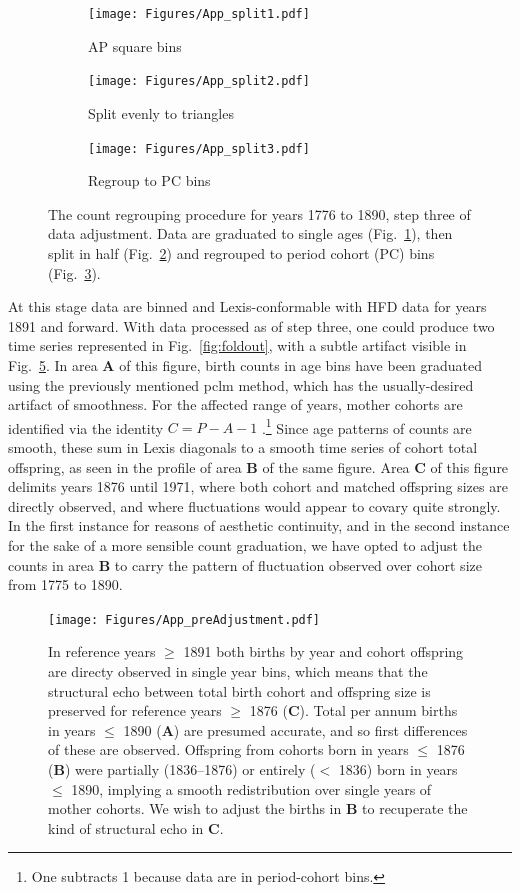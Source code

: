 \documentclass{article}
\begin{document}
\begin{appendix}
\begin{figure}[ht!]
\centering
\begin{subfigure}{.3\textwidth}
  \centering
  \texttt{[image: Figures/App\_split1.pdf]}
  \caption{AP square bins}
  \label{fig:app1}
\end{subfigure}%
\begin{subfigure}{.3\textwidth}
  \centering
  \texttt{[image: Figures/App\_split2.pdf]}
  \caption{Split evenly to triangles}
  \label{fig:app2}
\end{subfigure}
\begin{subfigure}{.3\textwidth}
  \centering
  \texttt{[image: Figures/App\_split3.pdf]}
  \caption{Regroup to PC bins}
  \label{fig:app3}
\end{subfigure}
\caption{The count regrouping procedure for years 1776 to 1890, step three of data adjustment. Data are graduated to single ages (Fig.~\ref{fig:app1}), then split in half (Fig.~\ref{fig:app2}) and regrouped to period cohort (PC) bins (Fig.~\ref{fig:app3}).}
\label{fig:AP2PC}
\end{figure}
At this stage data are binned and Lexis-conformable with HFD data for years 1891 and forward. With data processed as of step three, one could produce two time series represented in Fig.~\ref{fig:foldout}, with a subtle artifact visible in Fig.~\ref{fig:toosmooth}. In area \textbf{A} of this figure, birth counts in age bins have been graduated using the previously mentioned pclm method, which has the usually-desired artifact of smoothness. For the affected range of years, mother cohorts are identified via the identity $C = P - A - 1$ .\footnote{One subtracts 1 because data are in period-cohort bins.} Since age patterns of counts are smooth, these sum in Lexis diagonals to a smooth time series of cohort total offspring, as seen in the profile of area \textbf{B} of the same figure. Area \textbf{C} of this figure delimits years 1876 until 1971, where both cohort and matched offspring sizes are directly observed, and where fluctuations would appear to covary quite strongly. In the first instance for reasons of aesthetic continuity, and in the second instance for the sake of a more sensible count graduation, we have opted to adjust the counts in area \textbf{B} to carry the pattern of fluctuation observed over cohort size from 1775 to 1890.

\begin{figure}[ht!]
\centering
 \texttt{[image: Figures/App\_preAdjustment.pdf]}
\caption{In reference years $\ge$ 1891 both births by year and cohort offspring are directy observed in single year bins, which means that the structural echo between total birth cohort and offspring size is preserved for reference years $\ge$ 1876  (\textbf{C}). Total per annum births in years $\le$ 1890 (\textbf{A}) are presumed accurate, and so first differences of these are observed. Offspring from cohorts born in years $\le$ 1876 (\textbf{B}) were partially (1836--1876) or entirely ($<$ 1836) born in years $\le$ 1890, implying a smooth redistribution over single years of mother cohorts. We wish to adjust the births in \textbf{B} to recuperate the kind of structural echo in \textbf{C}.}
\label{fig:toosmooth}
\end{figure}


\end{appendix}
\end{document}
